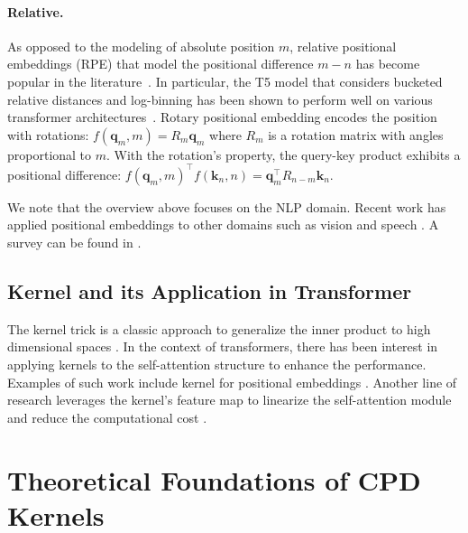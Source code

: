 \paragraph{Relative.} As opposed to the modeling of absolute position $m$, relative positional embeddings (RPE) that model the positional difference $m-n$ has become popular in the literature~\citep{shaw2018rpe,huang2018music,dai2019transformer,yang2019xlnet,huang2020rpe,he2021deberta,ke2021rethinking,chen2021simple}. In particular, the T5 model that considers bucketed relative distances and log-binning has been shown to perform well on various transformer architectures~\citep{raffel2019exploring}. Rotary positional embedding \citep{su2021roformer} encodes the position with rotations: $f(\bm q_m,m)=R_m\bm q_m$ where $R_m$ is a rotation matrix with angles proportional to $m$. With the rotation's property, the query-key product exhibits a positional difference: $f(\bm q_m,m)^\top f(\bm k_n,n)=\bm q_m^\top R_{n-m}\bm k_n$.

We note that the overview above focuses on the NLP domain. Recent work has applied positional embeddings to other domains such as vision \citep{Kan2021vision} and speech \citep{Likhomanenko2021CAPE}. A survey can be found in \citep{Dufter2022posOverview}. 

\subsection{Kernel and its Application in Transformer}
The kernel trick is a classic approach to generalize the inner product to high dimensional spaces \citep{mika1998kernelsvd,Schplkopf2000cpd,leslie2001kernelsvm,dhillon2004kernelkmeans,takeda2007kernelregress}. In the context of transformers, there has been interest in applying kernels to the self-attention structure to enhance the performance. Examples of such work include kernel for positional embeddings \citep{tsai2019transformer,wu2020transformer,wennberg2021case,luo2021stable}. Another line of research leverages the kernel's feature map \citep{Rahimi2007rndfeature} to linearize the self-attention module and reduce the computational cost \citep{katharopoulos20a,chen2021skyformer,xiong2021nystromformer,peng2021random,choromanski2021performers,qin2022cosformer}. %

\section{Theoretical Foundations of CPD Kernels}
\label{sec:cpd}

